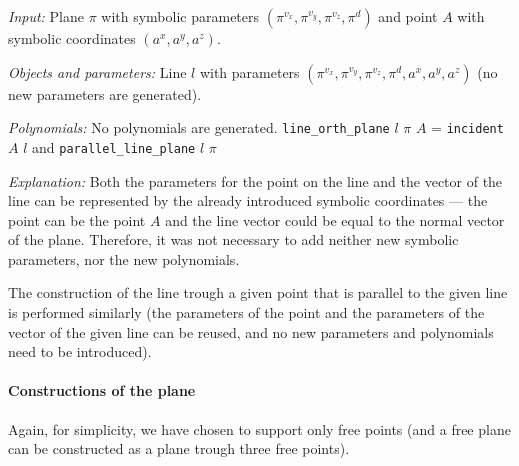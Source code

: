 \documentclass{aicom2e}
\begin{document}
\begin{description}
{\em Input:} Plane $\pi$ with symbolic parameters $(\pi^{v_x},
\pi^{v_y}, \pi^{v_z}, \pi^{d})$ and point $A$ with symbolic
coordinates $(a^x, a^y, a^z)$.

{\em Objects and parameters:} Line $l$ with parameters $(\pi^{v_x},
\pi^{v_y}, \pi^{v_z}, \pi^{d}, a^x, a^y, a^z)$ (no new parameters are
generated).

{\em Polynomials:} No polynomials are generated.
                   {\tt line\_orth\_plane} $l$ $\pi$ $A$ = {\tt incident} $A$ $l$ and {\tt parallel\_line\_plane} $l$ $\pi$

{\em Explanation:} Both the parameters for the point on the line and
the vector of the line can be represented by the already introduced
symbolic coordinates --- the point can be the point $A$ and the line
vector could be equal to the normal vector of the plane. Therefore, it
was not necessary to add neither new symbolic parameters, nor the new
polynomials.
\end{description}

The construction of the line trough a given point that is parallel to
the given line is performed similarly (the parameters of the point and
the parameters of the vector of the given line can be reused, and no
new parameters and polynomials need to be introduced).


\paragraph{Constructions of the plane}
Again, for simplicity, we have chosen to support only free points (and
a free plane can be constructed as a plane trough three free points).
\end{document}
